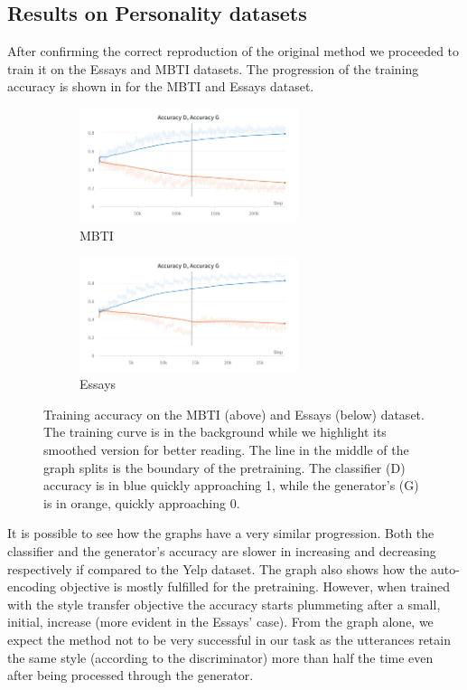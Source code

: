\documentclass[nomenclature, english, biblatex]{kththesis}
\begin{document}
\subsection{Results on Personality datasets}
After confirming the correct reproduction of the original method we proceeded to train it on the Essays and MBTI datasets. The progression of the training accuracy is shown in  for the MBTI and Essays dataset.
\begin{figure}[ht]
    \centering
    \begin{subfigure}{\textwidth}
        \centering
        \includegraphics[width=0.7\textwidth]{figures/mbti training smoothed.png}
        \caption{MBTI}
    \end{subfigure}
    \begin{subfigure}{\textwidth}
        \centering
        \includegraphics[width=0.7\textwidth]{figures/essays training smoothed.png}
        \caption{Essays}
    \end{subfigure}
    \caption{Training accuracy on the MBTI (above) and Essays (below) dataset. The training curve is in the background while we highlight its smoothed version for better reading. The line in the middle of the graph splits is the boundary of the pretraining. The classifier (D) accuracy is in blue quickly approaching 1, while the generator's (G) is in orange, quickly approaching 0.}
    \label{fig:mbti_essays_results}
\end{figure}
It is possible to see how the graphs have a very similar progression. Both the classifier and the generator's accuracy are slower in increasing and decreasing respectively if compared to the Yelp dataset. The graph also shows how the auto-encoding objective is mostly fulfilled for the pretraining. However, when trained with the style transfer objective the accuracy starts plummeting after a small, initial, increase (more evident in the Essays' case). From the graph alone, we expect the method not to be very successful in our task as the utterances retain the same style (according to the discriminator) more than half the time even after being processed through the generator. 
\end{document}
